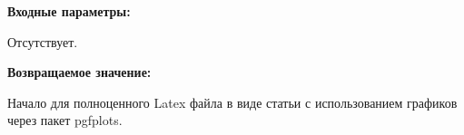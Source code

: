 \textbf{Входные параметры:}

Отсутствует.

\textbf{Возвращаемое значение:}

Начало для полноценного Latex файла в виде статьи с использованием графиков через пакет pgfplots.
